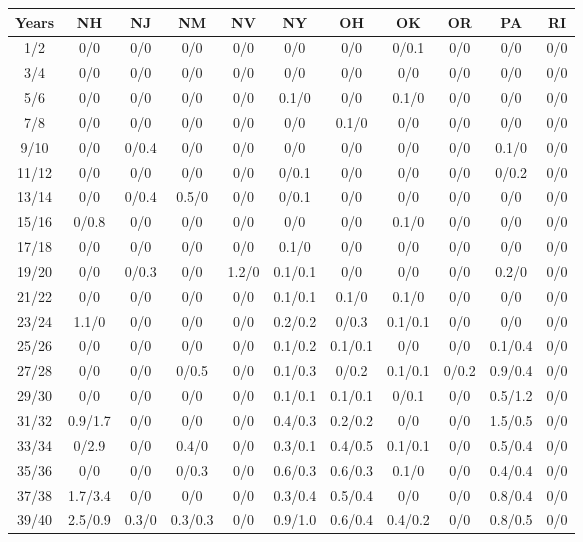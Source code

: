 \begin{table*}[htb]
\footnotesize
    \centering
    \begin{tabular}{|c| c c c c c c c c c c |}\hline
        \textbf{Years} & \textbf{NH}& \textbf{NJ}& \textbf{NM}& \textbf{NV}& \textbf{NY}& \textbf{OH}& \textbf{OK}& \textbf{OR}& \textbf{PA}& \textbf{RI} \\\hline
    1/2&0/0& 0/0& 0/0& 0/0& 0/0& 0/0& 0/0.1& 0/0& 0/0& 0/0\\\hline
3/4&0/0& 0/0& 0/0& 0/0& 0/0& 0/0& 0/0& 0/0& 0/0& 0/0\\\hline
5/6&0/0& 0/0& 0/0& 0/0& 0.1/0& 0/0& 0.1/0& 0/0& 0/0& 0/0\\\hline
7/8&0/0& 0/0& 0/0& 0/0& 0/0& 0.1/0& 0/0& 0/0& 0/0& 0/0\\\hline
9/10&0/0& 0/0.4& 0/0& 0/0& 0/0& 0/0& 0/0& 0/0& 0.1/0& 0/0\\\hline
11/12&0/0& 0/0& 0/0& 0/0& 0/0.1& 0/0& 0/0& 0/0& 0/0.2& 0/0\\\hline
13/14&0/0& 0/0.4& 0.5/0& 0/0& 0/0.1& 0/0& 0/0& 0/0& 0/0& 0/0\\\hline
15/16&0/0.8& 0/0& 0/0& 0/0& 0/0& 0/0& 0.1/0& 0/0& 0/0& 0/0\\\hline
17/18&0/0& 0/0& 0/0& 0/0& 0.1/0& 0/0& 0/0& 0/0& 0/0& 0/0\\\hline
19/20&0/0& 0/0.3& 0/0& 1.2/0& 0.1/0.1& 0/0& 0/0& 0/0& 0.2/0& 0/0\\\hline
21/22&0/0& 0/0& 0/0& 0/0& 0.1/0.1& 0.1/0& 0.1/0& 0/0& 0/0& 0/0\\\hline
23/24&1.1/0& 0/0& 0/0& 0/0& 0.2/0.2& 0/0.3& 0.1/0.1& 0/0& 0/0& 0/0\\\hline
25/26&0/0& 0/0& 0/0& 0/0& 0.1/0.2& 0.1/0.1& 0/0& 0/0& 0.1/0.4& 0/0\\\hline
27/28&0/0& 0/0& 0/0.5& 0/0& 0.1/0.3& 0/0.2& 0.1/0.1& 0/0.2& 0.9/0.4& 0/0\\\hline
29/30&0/0& 0/0& 0/0& 0/0& 0.1/0.1& 0.1/0.1& 0/0.1& 0/0& 0.5/1.2& 0/0\\\hline
31/32&0.9/1.7& 0/0& 0/0& 0/0& 0.4/0.3& 0.2/0.2& 0/0& 0/0& 1.5/0.5& 0/0\\\hline
33/34&0/2.9& 0/0& 0.4/0& 0/0& 0.3/0.1& 0.4/0.5& 0.1/0.1& 0/0& 0.5/0.4& 0/0\\\hline
35/36&0/0& 0/0& 0/0.3& 0/0& 0.6/0.3& 0.6/0.3& 0.1/0& 0/0& 0.4/0.4& 0/0\\\hline
37/38&1.7/3.4& 0/0& 0/0& 0/0& 0.3/0.4& 0.5/0.4& 0/0& 0/0& 0.8/0.4& 0/0\\\hline
39/40&2.5/0.9& 0.3/0& 0.3/0.3& 0/0& 0.9/1.0& 0.6/0.4& 0.4/0.2& 0/0& 0.8/0.5& 0/0\\\hline

\end{tabular}
\end{table*}
